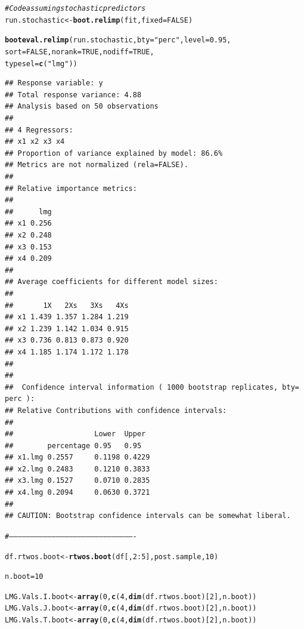 \documentclass[11pt,a4paper,twoside]{book}\usepackage[]{graphicx}\usepackage[]{color}
\makeatletter
\newcommand{\hlnum}[1]{\textcolor[rgb]{0.686,0.059,0.569}{#1}}%
\newcommand{\hlstr}[1]{\textcolor[rgb]{0.192,0.494,0.8}{#1}}%
\newcommand{\hlcom}[1]{\textcolor[rgb]{0.678,0.584,0.686}{\textit{#1}}}%
\newcommand{\hlopt}[1]{\textcolor[rgb]{0,0,0}{#1}}%
\newcommand{\hlstd}[1]{\textcolor[rgb]{0.345,0.345,0.345}{#1}}%
\newcommand{\hlkwb}[1]{\textcolor[rgb]{0.69,0.353,0.396}{#1}}%
\newcommand{\hlkwc}[1]{\textcolor[rgb]{0.333,0.667,0.333}{#1}}%
\newcommand{\hlkwd}[1]{\textcolor[rgb]{0.737,0.353,0.396}{\textbf{#1}}}%
\newenvironment{kframe}{%
 \def\at@end@of@kframe{}%
 \ifinner\ifhmode%
  \def\at@end@of@kframe{\end{minipage}}%
  \begin{minipage}{\columnwidth}%
 \fi\fi%
 \def\FrameCommand##1{\hskip\@totalleftmargin \hskip-\fboxsep
 \colorbox{shadecolor}{##1}\hskip-\fboxsep
     \hskip-\linewidth \hskip-\@totalleftmargin \hskip\columnwidth}%
 \MakeFramed {\advance\hsize-\width
   \@totalleftmargin\z@ \linewidth\hsize
   \@setminipage}}%
 {\par\unskip\endMakeFramed%
 \at@end@of@kframe}
\newenvironment{knitrout}{}{} %
\makeatother
\begin{document}
\begin{knitrout}
\color{fgcolor}\begin{kframe}
\begin{alltt}
\hlcom{#Code assuming stochastic predictors}
\hlstd{run.stochastic}\hlkwb{<-}\hlkwd{boot.relimp}\hlstd{(fit,} \hlkwc{fixed}\hlstd{=}\hlnum{FALSE}\hlstd{)}

\hlkwd{booteval.relimp}\hlstd{(run.stochastic,} \hlkwc{bty} \hlstd{=} \hlstr{"perc"}\hlstd{,} \hlkwc{level} \hlstd{=} \hlnum{0.95}\hlstd{,}
                \hlkwc{sort} \hlstd{=} \hlnum{FALSE}\hlstd{,} \hlkwc{norank} \hlstd{=} \hlnum{TRUE}\hlstd{,} \hlkwc{nodiff} \hlstd{=} \hlnum{TRUE}\hlstd{,}
                \hlkwc{typesel} \hlstd{=} \hlkwd{c}\hlstd{(}\hlstr{"lmg"}\hlstd{))}
\end{alltt}
\begin{verbatim}
## Response variable: y 
## Total response variance: 4.88 
## Analysis based on 50 observations 
## 
## 4 Regressors: 
## x1 x2 x3 x4 
## Proportion of variance explained by model: 86.6%
## Metrics are not normalized (rela=FALSE). 
## 
## Relative importance metrics: 
## 
##      lmg
## x1 0.256
## x2 0.248
## x3 0.153
## x4 0.209
## 
## Average coefficients for different model sizes: 
## 
##       1X   2Xs   3Xs   4Xs
## x1 1.439 1.357 1.284 1.219
## x2 1.239 1.142 1.034 0.915
## x3 0.736 0.813 0.873 0.920
## x4 1.185 1.174 1.172 1.178
## 
##  
##  Confidence interval information ( 1000 bootstrap replicates, bty= perc ): 
## Relative Contributions with confidence intervals: 
##  
##                   Lower  Upper
##        percentage 0.95   0.95  
## x1.lmg 0.2557     0.1198 0.4229
## x2.lmg 0.2483     0.1210 0.3833
## x3.lmg 0.1527     0.0710 0.2835
## x4.lmg 0.2094     0.0630 0.3721
## 
## CAUTION: Bootstrap confidence intervals can be somewhat liberal.
\end{verbatim}
\begin{alltt}
\hlcom{#----------------------------------------------------------------------------------------}


\hlstd{df.rtwos.boot} \hlkwb{<-}\hlkwd{rtwos.boot}\hlstd{(df[,}\hlnum{2}\hlopt{:}\hlnum{5}\hlstd{], post.sample,} \hlnum{10}\hlstd{)}

\hlstd{n.boot} \hlkwb{=} \hlnum{10}

\hlstd{LMG.Vals.I.boot}\hlkwb{<-}\hlkwd{array}\hlstd{(}\hlnum{0}\hlstd{,} \hlkwd{c}\hlstd{(}\hlnum{4}\hlstd{,}\hlkwd{dim}\hlstd{(df.rtwos.boot)[}\hlnum{2}\hlstd{], n.boot))}
\hlstd{LMG.Vals.J.boot}\hlkwb{<-}\hlkwd{array}\hlstd{(}\hlnum{0}\hlstd{,} \hlkwd{c}\hlstd{(}\hlnum{4}\hlstd{,}\hlkwd{dim}\hlstd{(df.rtwos.boot)[}\hlnum{2}\hlstd{], n.boot))}
\hlstd{LMG.Vals.T.boot}\hlkwb{<-}\hlkwd{array}\hlstd{(}\hlnum{0}\hlstd{,} \hlkwd{c}\hlstd{(}\hlnum{4}\hlstd{,}\hlkwd{dim}\hlstd{(df.rtwos.boot)[}\hlnum{2}\hlstd{], n.boot))}


\end{alltt}
\end{kframe}
\end{knitrout}
\end{document}
